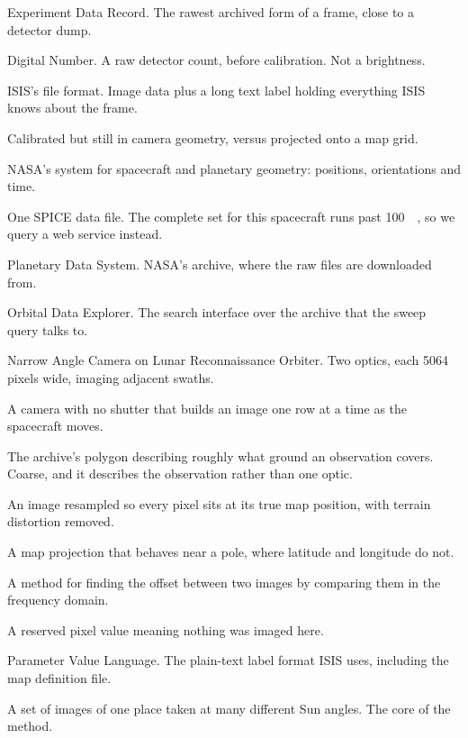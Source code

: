 \documentclass[11pt]{article}
\begin{document}
\begin{description}[style=nextline,leftmargin=0pt,itemsep=3pt]
\item[EDR] Experiment Data Record. The rawest archived form of a frame, close to a
detector dump.
\item[DN] Digital Number. A raw detector count, before calibration. Not a brightness.
\item[cube] ISIS's file format. Image data plus a long text label holding everything
ISIS knows about the frame.
\item[level 1 and level 2] Calibrated but still in camera geometry, versus projected
onto a map grid.
\item[SPICE] NASA's system for spacecraft and planetary geometry: positions,
orientations and time.
\item[kernel] One SPICE data file. The complete set for this spacecraft runs past
\SI{100}{\giga\byte}, so we query a web service instead.
\item[PDS] Planetary Data System. NASA's archive, where the raw files are downloaded
from.
\item[ODE] Orbital Data Explorer. The search interface over the archive that the sweep
query talks to.
\item[NAC] Narrow Angle Camera on Lunar Reconnaissance Orbiter. Two optics, each 5064
pixels wide, imaging adjacent swaths.
\item[line-scan camera] A camera with no shutter that builds an image one row at a time
as the spacecraft moves.
\item[footprint] The archive's polygon describing roughly what ground an observation
covers. Coarse, and it describes the observation rather than one optic.
\item[ortho] An image resampled so every pixel sits at its true map position, with
terrain distortion removed.
\item[polar stereographic] A map projection that behaves near a pole, where latitude and
longitude do not.
\item[phase correlation] A method for finding the offset between two images by comparing
them in the frequency domain.
\item[nodata] A reserved pixel value meaning nothing was imaged here.
\item[PVL] Parameter Value Language. The plain-text label format ISIS uses, including
the map definition file.
\item[solar sweep] A set of images of one place taken at many different Sun angles. The
core of the method.
\end{description}

\vfill
\begin{sloppypar}
\end{sloppypar}
\end{document}
